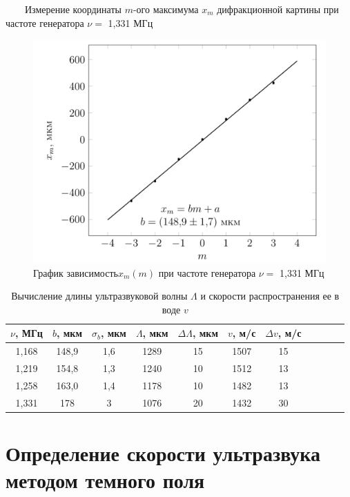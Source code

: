 \documentclass[journal, a4paper]{IEEEtran}
\begin{document}
	\begin{table}[h!]
	\centering
	
	\caption{~~~~Измерение координаты $ m $-ого максимума $ x_m $ дифракционной картины при частоте генератора $ \nu = $ 1,331 МГц}
	\label{nu4}
\end{table}	

\begin{figure}[h!]
	\centering
	\includegraphics[width=1.02\linewidth]{1.png}
	\caption{График зависимость$  x_m(m) $ при частоте генератора $ \nu = $ 1,331 МГц}
	\label{nu4_graf}
\end{figure}

	\begin{table}[h!]
	\centering
	\begin{tabular}{|c|c|c|c|c|c|c|c|c|c|c|}
\hline
$\nu$, МГц&$b$, мкм&$\sigma_b$, мкм&$\Lambda$, мкм&$\Delta \Lambda$, мкм&$v$, м/с&$\Delta v$, м/с\\
\hline
1,168&148,9&1,6&1289&15&1507&15\\
\hline
1,219&154,8&1,3&1240&10&1512&13\\
\hline
1,258&163,0&1,4&1178&10&1482&13\\
\hline
1,331&178&3&1076&20&1432&30\\
\hline
\end{tabular}
	\caption{Вычисление длины ультразвуковой волны $ \Lambda $ и скорости распространения ее в воде $ v $}
	\label{speed}
\end{table}	


\section{Определение скорости ультразвука методом темного поля}
	
\end{document}
